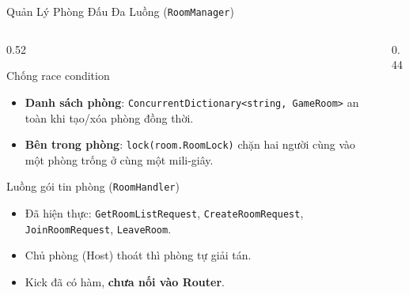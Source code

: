 \begin{frame}{Quản Lý Phòng Đấu Đa Luồng (\texttt{RoomManager})}
  \begin{columns}[T]
    \begin{column}{0.52\textwidth}
      \begin{block}{Chống race condition}
        \begin{itemize}\setlength{\itemsep}{0pt}
          \item \textbf{Danh sách phòng}: \texttt{Concurrent\allowbreak Dictionary<string, GameRoom>} an toàn khi tạo/xóa phòng đồng thời.
          \item \textbf{Bên trong phòng}: \texttt{lock(room.RoomLock)} chặn hai người cùng vào một phòng trống ở cùng một mili-giây.
        \end{itemize}
      \end{block}
      \begin{exampleblock}{Luồng gói tin phòng (\texttt{RoomHandler})}
        \begin{itemize}\setlength{\itemsep}{0pt}
          \item Đã hiện thực: \texttt{GetRoomListRequest}, \texttt{CreateRoomRequest}, \texttt{JoinRoomRequest}, \texttt{LeaveRoom}.
          \item Chủ phòng (Host) thoát thì phòng tự giải tán.
          \item Kick đã có hàm, \textbf{chưa nối vào Router}.
        \end{itemize}
      \end{exampleblock}
    \end{column}
    \begin{column}{0.44\textwidth}
      \centering
    \end{column}
  \end{columns}
\end{frame}

